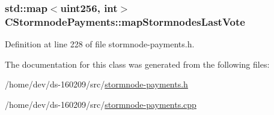 \subsubsection[{map\+Stormnodes\+Last\+Vote}]{\setlength{\rightskip}{0pt plus 5cm}std\+::map$<${\bf uint256}, int$>$ C\+Stormnode\+Payments\+::map\+Stormnodes\+Last\+Vote}\label{class_c_stormnode_payments_a82f9ee8e4388b9640854bd3c70b76782}


Definition at line 228 of file stormnode-\/payments.\+h.



The documentation for this class was generated from the following files\+:\begin{DoxyCompactItemize}
\item 
/home/dev/ds-\/160209/src/\hyperlink{stormnode-payments_8h}{stormnode-\/payments.\+h}\item 
/home/dev/ds-\/160209/src/\hyperlink{stormnode-payments_8cpp}{stormnode-\/payments.\+cpp}\end{DoxyCompactItemize}
